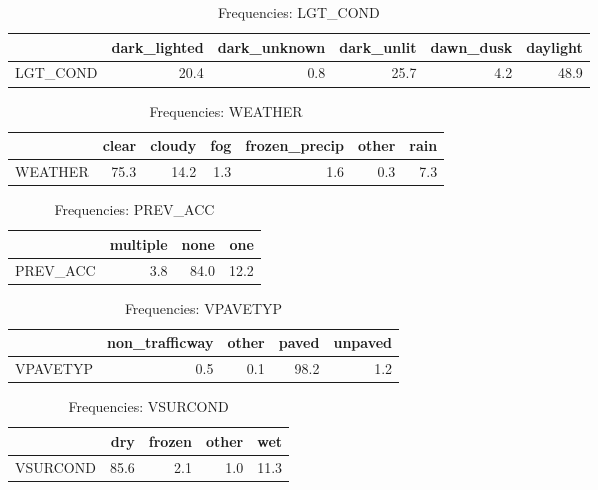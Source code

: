 \begin{table}[ht]
\centering
\begin{tabular}{rrrrrr}
  \toprule
 & dark\_lighted & dark\_unknown & dark\_unlit & dawn\_dusk & daylight \\ 
  \midrule
LGT\_COND & 20.4 & 0.8 & 25.7 & 4.2 & 48.9 \\ 
   \bottomrule
\end{tabular}
\caption{Frequencies: LGT_COND} 
\end{table}
\begin{table}[ht]
\centering
\begin{tabular}{rrrrrrr}
  \toprule
 & clear & cloudy & fog & frozen\_precip & other & rain \\ 
  \midrule
WEATHER & 75.3 & 14.2 & 1.3 & 1.6 & 0.3 & 7.3 \\ 
   \bottomrule
\end{tabular}
\caption{Frequencies: WEATHER} 
\end{table}
\begin{table}[ht]
\centering
\begin{tabular}{rrrr}
  \toprule
 & multiple & none & one \\ 
  \midrule
PREV\_ACC & 3.8 & 84.0 & 12.2 \\ 
   \bottomrule
\end{tabular}
\caption{Frequencies: PREV_ACC} 
\end{table}
\begin{table}[ht]
\centering
\begin{tabular}{rrrrr}
  \toprule
 & non\_trafficway & other & paved & unpaved \\ 
  \midrule
VPAVETYP & 0.5 & 0.1 & 98.2 & 1.2 \\ 
   \bottomrule
\end{tabular}
\caption{Frequencies: VPAVETYP} 
\end{table}
\begin{table}[ht]
\centering
\begin{tabular}{rrrrr}
  \toprule
 & dry & frozen & other & wet \\ 
  \midrule
VSURCOND & 85.6 & 2.1 & 1.0 & 11.3 \\ 
   \bottomrule
\end{tabular}
\caption{Frequencies: VSURCOND} 
\end{table}
